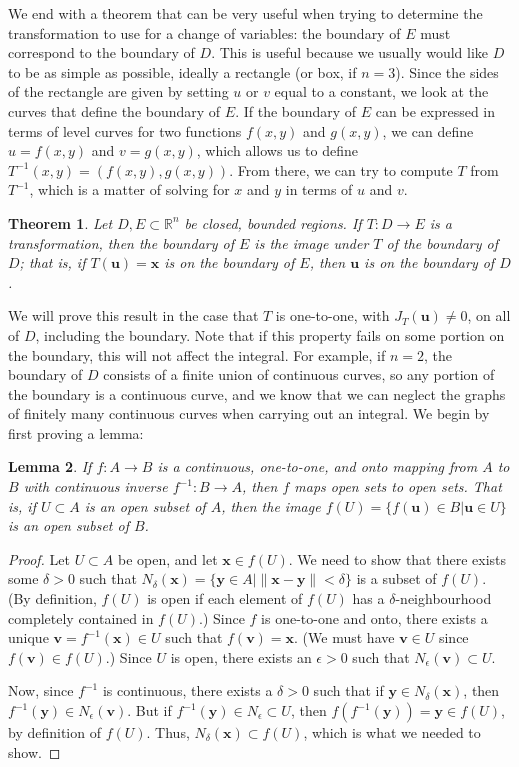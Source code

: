 \documentclass[12pt,letterpaper]{article}
\newtheorem{theorem}{Theorem}
\newtheorem{lemma}[theorem]{Lemma}
\newcommand{\R}{\mathbb{R}}
\newcommand{\x}{\mathbf{x}}
\newcommand{\uu}{\mathbf{u}}
\newcommand{\y}{\mathbf{y}}
\newcommand{\len}[1]{\lVert #1\rVert}
\begin{document}
We end with a theorem that can be very useful when trying to determine the transformation to use for a change of variables: the boundary of $E$ must correspond to the boundary of $D$. This is useful because we usually would like $D$ to be as simple as possible, ideally a rectangle (or box, if $n=3$). Since the sides of the rectangle are given by setting $u$ or $v$ equal to a constant, we look at the curves that define the boundary of $E$. If the boundary of $E$ can be expressed in terms of level curves for two functions $f(x,y)$ and $g(x,y)$, we can define $u=f(x,y)$ and $v=g(x,y)$, which allows us to define $T^{-1}(x,y) = (f(x,y),g(x,y))$. From there, we can try to compute $T$ from $T^{-1}$, which is a matter of solving for $x$ and $y$ in terms of $u$ and $v$.
\begin{theorem}\label{theroem}
Let $D,E\subset \R^n$ be closed, bounded regions. If $T:D\to E$ is a transformation, then the boundary of $E$ is the image under $T$ of the boundary of $D$; that is, if $T(\uu)=\x$ is on the boundary of $E$, then $\uu$ is on the boundary of $D$.
\end{theorem}
We will prove this result in the case that $T$ is one-to-one, with $J_T(\uu)\neq 0$, on all of $D$, including the boundary. Note that if this property fails on some portion on the boundary, this will not affect the integral. For example, if $n=2$, the boundary of $D$ consists of a finite union of continuous curves, so any portion of the boundary is a continuous curve, and we know that we can neglect the graphs of finitely many continuous curves when carrying out an integral. We begin by first proving a lemma:
\begin{lemma}\label{lem}
If $f:A\to B$ is a continuous, one-to-one, and onto mapping from $A$ to $B$ with continuous inverse $f^{-1}:B\to A$, then $f$ maps open sets to open sets. That is, if $U\subset A$ is an open subset of $A$, then the image $f(U) = \{f(\uu)\in B|\uu\in U\}$ is an open subset of $B$.
\end{lemma}
\begin{proof}
Let $U\subset A$ be open, and let $\x\in f(U)$. We need to show that there exists some $\delta>0$ such that $N_\delta(\x) = \{\y\in A| \len{\x-\y}<\delta\}$ is a subset of $f(U)$. (By definition, $f(U)$ is open if each element of $f(U)$ has a $\delta$-neighbourhood completely contained in $f(U)$.) Since $f$ is one-to-one and onto, there exists a unique $\mathbf{v}=f^{-1}(\x)\in U$ such that $f(\mathbf{v})=\x$. (We must have $\mathbf{v}\in U$ since $f(\mathbf{v})\in f(U)$.) Since $U$ is open, there exists an $\epsilon>0$ such that $N_\epsilon(\mathbf{v})\subset U$.

Now, since $f^{-1}$ is continuous, there exists a $\delta>0$ such that if $\y\in N_\delta(\x)$, then $f^{-1}(\y)\in N_\epsilon(\mathbf{v})$. But if $f^{-1}(\y)\in N_\epsilon\subset U$, then $f(f^{-1}(\y))=\y\in f(U)$, by definition of $f(U)$. Thus, $N_\delta(\x)\subset f(U)$, which is what we needed to show.
\end{proof}
\end{document}
